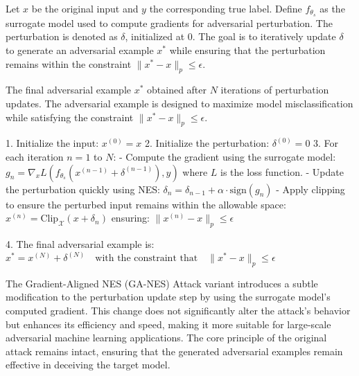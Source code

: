 Let \( x \) be the original input and \( y \) the corresponding true label. Define \( f_{\theta_s} \) as the surrogate model used to compute gradients for adversarial perturbation. The perturbation is denoted as \( \delta \), initialized at \( 0 \). The goal is to iteratively update \( \delta \) to generate an adversarial example \( x^* \) while ensuring that the perturbation remains within the constraint \( \|x^* - x\|_p \leq \epsilon \).

The final adversarial example \( x^* \) obtained after \( N \) iterations of perturbation updates. The adversarial example is designed to maximize model misclassification while satisfying the constraint \( \|x^* - x\|_p \leq \epsilon \).


1. Initialize the input:
   $x^{(0)} = x$
2. Initialize the perturbation:
   $\delta^{(0)} = 0$
3. For each iteration $n = 1$ to $N$:
   - Compute the gradient using the surrogate model:
   $g_n = \nabla_x L(f_{\theta_s}(x^{(n-1)} + \delta^{(n-1)}), y)$
   where $L$ is the loss function.
   - Update the perturbation quickly using NES:
   $\delta_n = \delta_{n-1} + \alpha \cdot \text{sign}(g_n)$
   - Apply clipping to ensure the perturbed input remains within the allowable space:
   $x^{(n)} = \text{Clip}_{\mathcal{X}}(x + \delta_n)$
   ensuring:
   $\|x^{(n)} - x\|_p \leq \epsilon$

4. The final adversarial example is:
   $x^* = x^{(N)} + \delta^{(N)} \quad \text{with the constraint that} \quad \|x^* - x\|_p \leq \epsilon$

The  Gradient-Aligned NES (GA-NES) Attack variant introduces a subtle modification to the perturbation update step by using the surrogate model's computed gradient. This change does not significantly alter the attack's behavior but enhances its efficiency and speed, making it more suitable for large-scale adversarial machine learning applications. The core principle of the original attack remains intact, ensuring that the generated adversarial examples remain effective in deceiving the target model.
